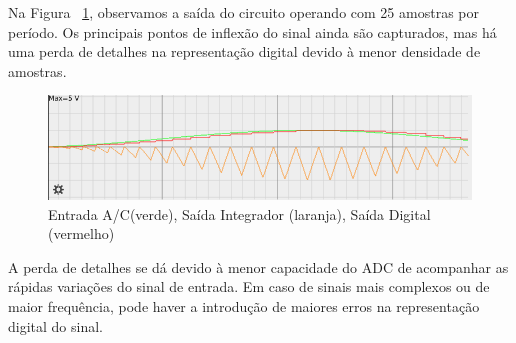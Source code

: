 Na Figura ~\ref{fig:falstad_simulator_output_25_samples}, observamos a saída do circuito operando com 25 amostras por período. Os principais pontos de inflexão do sinal ainda são capturados, mas há uma perda de detalhes na representação digital devido à menor densidade de amostras.

\begin{figure}[H]
    \centering
    \includegraphics[width=1\linewidth]{03_results/assets/signal_output_25_samplings.png}
    \caption{Entrada A/C(verde), Saída Integrador (laranja), Saída Digital (vermelho)}
    \label{fig:falstad_simulator_output_25_samples}
\end{figure}

A perda de detalhes se dá devido à menor capacidade do ADC de acompanhar as rápidas variações do sinal de entrada. Em caso de sinais mais complexos ou de maior frequência, pode haver a introdução de maiores erros na representação digital do sinal.
